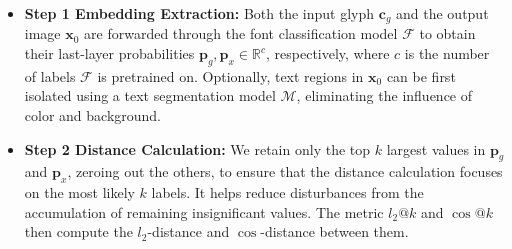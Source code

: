 \begin{itemize}
    \item \textbf{Step 1 Embedding Extraction:} Both the input glyph $\boldsymbol{c}_g$ and the output image $\boldsymbol{x}_0$ are forwarded through the font classification model $\mathcal{F}$ to obtain their last-layer probabilities $\boldsymbol{p}_g, \boldsymbol{p}_x \in \mathbb{R}^{c}$, respectively, where $c$ is the number of labels $\mathcal{F}$ is pretrained on. Optionally, text regions in $\boldsymbol{x}_0$ can be first isolated using a text segmentation model $\mathcal{M}$, eliminating the influence of color and background.
    \item \textbf{Step 2 Distance Calculation:} We retain only the top $k$ largest values in $\boldsymbol{p}_g$ and $\boldsymbol{p}_x$, zeroing out the others, to ensure that the distance calculation focuses on the most likely $k$ labels. It helps reduce disturbances from the accumulation of remaining insignificant values. The metric $l_2@k$ and $\cos@k$ then compute the $l_2$-distance and $\cos$-distance between them.

 
\end{itemize}